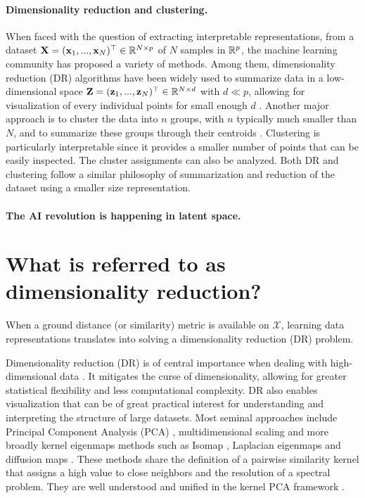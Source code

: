 \paragraph{Dimensionality reduction and clustering.}
When faced with the question of extracting
interpretable representations, from a dataset ${\mathbf{X}} = ({\mathbf{x}}_1, ..., {\mathbf{x}}_N) ^\top
\in \mathbb{R}^{N \times p}$ of $N$ samples in $\mathbb{R}^p$, the machine learning community
has proposed a variety of methods. Among them, dimensionality reduction (DR) algorithms have been widely used to summarize data in a low-dimensional space
${\mathbf{Z}} = ({\mathbf{z}}_1, ..., {\mathbf{z}}_N) ^\top \in \mathbb{R}^{N \times d}$ with $d \ll p$, allowing
for visualization of every individual points for small enough $d$ \citep{agrawal2021minimum,van2009dimensionality}.
Another major approach is to cluster the data into $n$ groups, with $n$
typically much smaller than $N$, and to summarize these groups through their centroids \citep{saxena2017review,ezugwu2022comprehensive}.
Clustering is particularly interpretable since it provides a
smaller number of points that can be easily inspected. %
The cluster assignments can also be analyzed. %
Both DR and clustering follow a
similar philosophy of summarization and reduction of the dataset using a smaller size representation.



\paragraph{The AI revolution is happening in latent space.}


\section{What is referred to as dimensionality reduction?}


When a ground distance (or similarity) metric is available on $\mathcal{X}$, learning data representations translates into solving a dimensionality reduction (DR) problem.


Dimensionality reduction (DR) is of central importance when dealing with high-dimensional data \citep{donoho2000high}. It mitigates the curse of dimensionality, allowing for greater statistical flexibility and less computational complexity. DR also enables visualization that can be of great practical interest for understanding and interpreting the structure of large datasets.
Most seminal approaches include Principal Component Analysis (PCA) \citep{pearson1901liii},  multidimensional scaling \citep{kruskal1978multidimensional} and more broadly kernel eigenmaps methods such as Isomap \citep{balasubramanian2002isomap}, Laplacian eigenmaps \citep{belkin2003laplacian} and diffusion maps \citep{coifman2006diffusion}. These methods share the definition of a pairwise similarity kernel that assigns a high value to close neighbors and the resolution of a spectral problem. They are well understood and unified in the kernel PCA framework \citep{ham2004kernel}.

